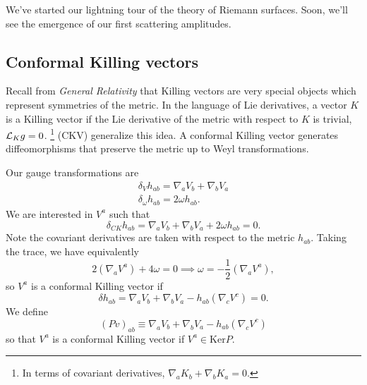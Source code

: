 We've started our lightning tour of the theory of Riemann surfaces. Soon, we'll see the emergence of our first scattering amplitudes.

\subsection*{Conformal Killing vectors} Recall from \emph{General Relativity} that Killing vectors are very special objects which represent symmetries of the metric. In the language of Lie derivatives, a vector $K$ is a Killing vector if the Lie derivative of the metric with respect to $K$ is trivial, $\mathcal L_K g =0$.%
    \footnote{In terms of covariant derivatives, $\nabla_a K_b + \nabla_b K_a = 0$.
    }
 (CKV) generalize this idea. A conformal Killing vector generates diffeomorphisms that preserve the metric up to Weyl transformations.

Our gauge transformations are
\begin{gather}
    \delta_V h_{ab} = \nabla_a V_b +\nabla_b V_a\\
    \delta_\omega h_{ab} = 2\omega h_{ab}.
\end{gather}
We are interested in $V^a$ such that
\begin{equation}
    \delta_{CK} h_{ab}=\nabla_a V_b + \nabla_b V_a + 2\omega h_{ab}=0.
\end{equation}
Note the covariant derivatives are taken with respect to the metric $h_{ab}$. Taking the trace, we have equivalently
\begin{equation}
    2(\nabla_a V^a) +4\omega = 0 \implies \omega = -\frac{1}{2} (\nabla_a V^a),
\end{equation}
so $V^a$ is a conformal Killing vector if
\begin{equation}
    \delta h_{ab} = \nabla_a V_b + \nabla_b V_a - h_{ab}(\nabla_c V^c)=0.
\end{equation}
We define
\begin{equation}
    (Pv)_{ab}\equiv \nabla_a V_b+ \nabla_b V_a -h_{ab}(\nabla_c V^c)
\end{equation}
so that $V^a$ is a conformal Killing vector if $V^a\in \text{Ker}P$.

